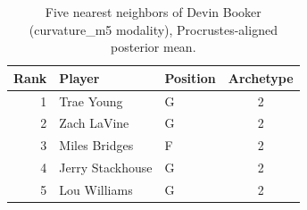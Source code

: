 \begin{table}[htbp]
  \centering\small
  \begin{tabular}{rllc}
    \toprule
    Rank & Player & Position & Archetype \\
    \midrule
    1 & Trae Young & G & 2 \\
    2 & Zach LaVine & G & 2 \\
    3 & Miles Bridges & F & 2 \\
    4 & Jerry Stackhouse & G & 2 \\
    5 & Lou Williams & G & 2 \\
    \bottomrule
  \end{tabular}
  \caption{Five nearest neighbors of Devin Booker (curvature_m5 modality), Procrustes-aligned posterior mean.}
  \label{tab:Devin_Booker_neighbors_curvature_m5}
\end{table}

